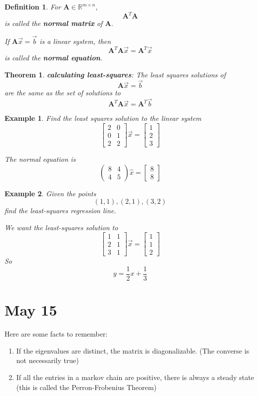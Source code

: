 \documentclass[11pt]{article}
\newtheorem{thm}{Theorem}
\newtheorem{defn}{Definition}
\newtheorem{ex}{Example}
\begin{document}
\begin{defn}
  For $\mathbf{A} \in \mathbb{R}^{m \times n}$,
  \[\mathbf{A}^{T}\mathbf{A}\]
  is called the \textbf{normal matrix} of $\mathbf{A}$.

  If $\mathbf{A}\vec{x} = \vec{b}$ is a linear system, then
  \[\mathbf{A}^{T}\mathbf{A} \vec{x} = \mathbf{A}^{T}\vec{x}\]
  is called the \textbf{normal equation}.
\end{defn}
\begin{thm}
  \textbf{calculating least-squares}: The least squares solutions of
  \[\mathbf{A}\vec{x} = \vec{b}\]
  are the same as the set of solutions to
  \[\mathbf{A}^{T}\mathbf{A} \vec{x} = \mathbf{A}^{T}\vec{b}\]
\end{thm}
\begin{ex}
  Find the least squares solution to the linear system
  \[\begin{bmatrix} 2 & 0 \\ 0 & 1 \\ 2 & 2 \end{bmatrix} \vec{x} = \begin{bmatrix} 1 \\ 2 \\ 3 \end{bmatrix}\]

  The normal equation is
  \[
\left(\begin{array}{rr}
8 & 4 \\
4 & 5
\end{array}\right)\hat{x} = \begin{bmatrix} 8 \\ 8 \end{bmatrix} \]
\end{ex}

\begin{ex}
  Given the points
  \[(1,1), (2,1), (3,2)\]
  find the least-squares regression line.

  We want the least-squares solution to
\[\begin{bmatrix} 1  & 1 \\ 2 & 1 \\ 3 & 1\end{bmatrix} \vec{x} = \begin{bmatrix} 1 \\ 1 \\ 2 \end{bmatrix}\]
So
\[y = \frac{1}{2}x + \frac{1}{3}\]
\end{ex}
\section{May 15}
Here are some facts to remember:
\begin{enumerate}
  \item If the eigenvalues are distinct, the matrix is diagonalizable. (The converse is not necessarily true)
  \item If all the entries in a markov chain are positive, there is always a steady state (this is called the Perron-Frobenius Theorem)
\end{enumerate}
\end{document}
